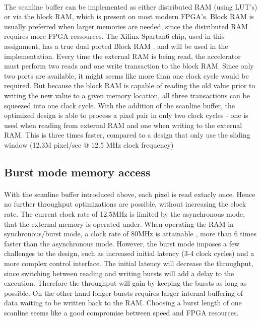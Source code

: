 \paragraph*{}
The scanline buffer can be implemented as either distributed RAM (using LUT's) or via the block RAM, which is present on most modern FPGA's. Block RAM is usually preferred when larger memories are needed, since the distributed RAM requires more FPGA ressources. The Xilinx Spartan6 chip, used in this assignment, has a true dual ported Block RAM \cite{Xilinx:UG383}, and will be used in the implementation.
Every time the external RAM is being read, the accelerator must perform two reads and one write transaction to the block RAM. Since only two ports are available, it might seems like more than one clock cycle would be required. But because the block RAM is capable of reading the old value prior to writing the new value to a given memory location, all three transactions can be squeezed into one clock cycle.
With the addition of the scanline buffer, the optimized design is able to process a pixel pair in only two clock cycles - one is used when reading from external RAM and one when writing to the external RAM. This is three times faster, compared to a design that only use the sliding window (12.3M pixel/sec @ 12.5 MHz clock frequency)

\subsection*{Burst mode memory access}
\label{sec:burstmode}
\paragraph*{}
With the scanline buffer introduced above, each pixel is read extacly once. Hence no further throughput optimizations are possible, without increasing the clock rate. The current clock rate of 12.5MHz is limited by the asynchronous mode, that the external memory is operated under. When operating the RAM in synchronous/burst mode, a clock rate of 80MHz is attainable \cite{Micron:CellularRAM}, more than 6 times faster than the asynchronous mode.
However, the burst mode imposes a few challenges to the design, such as increased initial latency (3-4 clock cycles) and a more complex control interface. The initial latency will decrease the throughput, since switching between reading and writing bursts will add a delay to the execution. Therefore the throughput will gain by keeping the bursts as long as possible. On the other hand longer bursts requires larger internal buffering of data waiting to be written back to the RAM. Choosing a burst length of one scanline seems like a good compromise between speed and FPGA resources.

